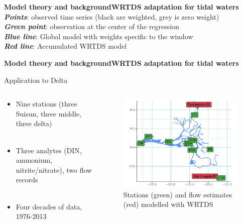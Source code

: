 \documentclass[serif]{beamer}\usepackage[]{graphicx}\usepackage[]{color}
\newcommand{\emtxt}[1]{\textbf{\textit{#1}}}
\begin{document}
\begin{frame}[t]{\textbf{Model theory and background}}{\textbf{WRTDS adaptation for tidal waters}}
{\small
\emtxt{Points}: observed time series (black are weighted, grey is zero weight)\\
\emtxt{Green point}: observation at the center of the regression\\
\emtxt{Blue line}: Global model with weights specific to the window\\
\emtxt{Red line}: Accumulated WRTDS model
}
\begin{center}
\end{center}
\end{frame} 
 

 
\begin{frame}{\textbf{Model theory and background}}{\textbf{WRTDS adaptation for tidal waters}} 
{\bf \centerline{Application to Delta}}
\begin{columns}
\begin{column}{0.45\textwidth}
\begin{itemize}
\item Nine stations (three Suisun, three middle, three delta) \\~\\
\item Three analytes (DIN, ammonium, nitrite/nitrate), two flow records \\~\\
\item Four decades of data, 1976-2013
\end{itemize}
\end{column}
\begin{column}{0.5\textwidth}
\begin{figure}
\begin{center}
\includegraphics[width = \textwidth]{fig/stations.pdf}
\caption{Stations (green) and flow estimates (red) modelled with WRTDS}
\end{center}
\end{figure}
\end{column}
\end{columns}
\end{frame}
\end{document}
